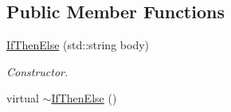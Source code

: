 \subsection*{Public Member Functions}
\begin{DoxyCompactItemize}
\item 
\hyperlink{class_if_then_else_abf6f0e5ecce77a24b5cee1e31190818f}{If\-Then\-Else} (std\-::string body)
\begin{DoxyCompactList}\small\item\em Constructor. \end{DoxyCompactList}\item 
\hypertarget{class_if_then_else_a14d1c1cea52dd3b9939de1e6b54b86c6}{virtual \hyperlink{class_if_then_else_a14d1c1cea52dd3b9939de1e6b54b86c6}{$\sim$\-If\-Then\-Else} ()}\label{class_if_then_else_a14d1c1cea52dd3b9939de1e6b54b86c6}


\end{DoxyCompactItemize}
